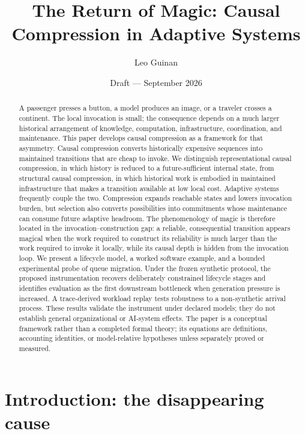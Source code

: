 \documentclass[11pt]{article}
\title{The Return of Magic: Causal Compression in Adaptive Systems}
\author{Leo Guinan}
\date{Draft --- September 2026}
\begin{document}
\maketitle

\begin{abstract}
A passenger presses a button, a model produces an image, or a traveler crosses a continent. The local invocation is small; the consequence depends on a much larger historical arrangement of knowledge, computation, infrastructure, coordination, and maintenance. This paper develops causal compression as a framework for that asymmetry. Causal compression converts historically expensive sequences into maintained transitions that are cheap to invoke. We distinguish representational causal compression, in which history is reduced to a future-sufficient internal state, from structural causal compression, in which historical work is embodied in maintained infrastructure that makes a transition available at low local cost. Adaptive systems frequently couple the two. Compression expands reachable states and lowers invocation burden, but selection also converts possibilities into commitments whose maintenance can consume future adaptive headroom. The phenomenology of magic is therefore located in the invocation--construction gap: a reliable, consequential transition appears magical when the work required to construct its reliability is much larger than the work required to invoke it locally, while its causal depth is hidden from the invocation loop. We present a lifecycle model, a worked software example, and a bounded experimental probe of queue migration. Under the frozen synthetic protocol, the proposed instrumentation recovers deliberately constrained lifecycle stages and identifies evaluation as the first downstream bottleneck when generation pressure is increased. A trace-derived workload replay tests robustness to a non-synthetic arrival process. These results validate the instrument under declared models; they do not establish general organizational or AI-system effects. The paper is a conceptual framework rather than a completed formal theory; its equations are definitions, accounting identities, or model-relative hypotheses unless separately proved or measured.
\end{abstract}

\section{Introduction: the disappearing cause}
\end{document}
